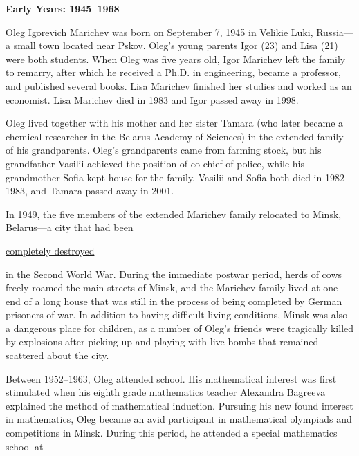\small



\smallskip



\noindent

\textbf{Early Years: 1945–1968}



\noindent

Oleg Igorevich Marichev was born on September 7, 1945 in Velikie Luki, Russia—a small town located near Pskov. Oleg's young parents Igor (23) and Lisa (21) were both students. When Oleg was five years old, Igor Marichev left the family to remarry, after which he received a Ph.D. in engineering, became a professor, and published several books. Lisa Marichev finished her studies and worked as an economist. Lisa Marichev died in 1983 and Igor passed away in 1998.



Oleg lived together with his mother and her sister Tamara (who later became a chemical researcher in the Belarus Academy of Sciences) in the extended family of his grandparents. Oleg's grandparents came from farming stock, but his grandfather Vasilii achieved the position of co-chief of police, while his grandmother Sofia kept house for the family. Vasilii and Sofia both died in 1982–1983, and Tamara passed away in 2001.



In 1949, the five members of the extended Marichev family relocated to Minsk, Belarus—a city that had been 

\href{https://us.search.yahoo.com/search?p=Minsk+photo+1944}{completely destroyed}

in the Second World War. During the immediate postwar period, herds of cows freely roamed the main streets of Minsk, and the Marichev family lived at one end of a long house that was still in the process of being completed by German prisoners of war. In addition to having difficult living conditions, Minsk was also a dangerous place for children, as a number of Oleg's friends were tragically killed by explosions after picking up and playing with live bombs that remained scattered about the city.



Between 1952–1963, Oleg attended school. His mathematical interest was first stimulated when his eighth grade mathematics teacher Alexandra Bagreeva explained the method of mathematical induction. Pursuing his new found interest in mathematics, Oleg became an avid participant in mathematical olympiads and competitions in Minsk. During this period, he attended a special mathematics school at 

